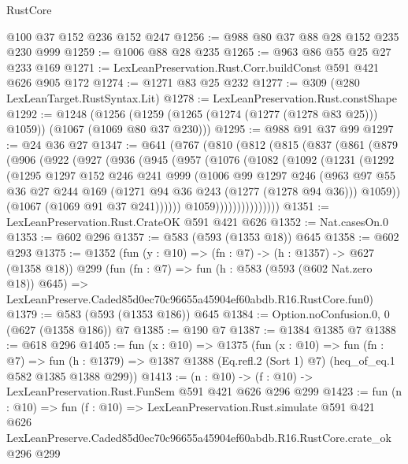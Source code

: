 \begin{lexlean}{RustCore}
\begin{coremodule}
    @100
    @37
    @152
    @236
    @152
    @247
@1256 := @988 @80 @37 @88 @28 @152 @235 @230 @999
@1259 := @1006 @88 @28 @235
@1265 := @963 @86 @55 @25 @27 @233 @169
@1271 := LexLeanPreservation.Rust.Corr.buildConst @591 @421 @626 @905 @172
@1274 := @1271 @83 @25 @232
@1277 := @309 (@280 LexLeanTarget.RustSyntax.Lit)
@1278 := LexLeanPreservation.Rust.constShape
@1292 := @1248
    (@1256 (@1259 (@1265 (@1274 (@1277 (@1278 @83 @25))) @1059)) (@1067 (@1069 @80 @37 @230)))
@1295 := @988 @91 @37 @99
@1297 := @24 @36 @27
@1347 := @641
    (@767
      (@810
        (@812
          (@815
            (@837
              (@861
                (@879
                  (@906
                    (@922
                      (@927
                        (@936
                          (@945
                            (@957
                              (@1076
                                (@1082
                                  (@1092
                                    (@1231
                                      (@1292
                                        (@1295
                                          @1297
                                          @152
                                          @246
                                          @241
                                          @999
                                          (@1006
                                            @99
                                            @1297
                                            @246
                                            (@963
                                              @97
                                              @55
                                              @36
                                              @27
                                              @244
                                              @169
                                              (@1271 @94 @36 @243 (@1277 (@1278 @94 @36)))
                                              @1059))
                                          (@1067 (@1069 @91 @37 @241))))))
                                  @1059)))))))))))))))
@1351 := LexLeanPreservation.Rust.CrateOK @591 @421 @626
@1352 := Nat.casesOn.{0}
@1353 := @602 @296
@1357 := @583 (@593 (@1353 @18)) @645
@1358 := @602 @293
@1375 := @1352
    (fun (y : @10) => (fn : @7) -> (h : @1357) -> @627 (@1358 @18))
    @299
    (fun (fn : @7) =>
    fun (h : @583 (@593 (@602 Nat.zero @18)) @645) =>
    LexLeanPreserve.Caded85d0ec70c96655a45904ef60abdb.R16.RustCore.fun0)
@1379 := @583 (@593 (@1353 @186)) @645
@1384 := Option.noConfusion.{0, 0} (@627 (@1358 @186)) @7
@1385 := @190 @7
@1387 := @1384 @1385 @7
@1388 := @618 @296
@1405 := fun (x : @10) =>
  @1375
    (fun (x : @10) =>
    fun (fn : @7) =>
    fun (h : @1379) => @1387 @1388 (Eq.refl.{2} (Sort 1) @7) (heq_of_eq.{1} @582 @1385 @1388 @299))
@1413 := (n : @10) -> (f : @10) -> LexLeanPreservation.Rust.FunSem @591 @421 @626 @296 @299
@1423 := fun (n : @10) =>
  fun (f : @10) =>
  LexLeanPreservation.Rust.simulate
    @591
    @421
    @626
    LexLeanPreserve.Caded85d0ec70c96655a45904ef60abdb.R16.RustCore.crate_ok
    @296
    @299
\end{coremodule}
\end{lexlean}

